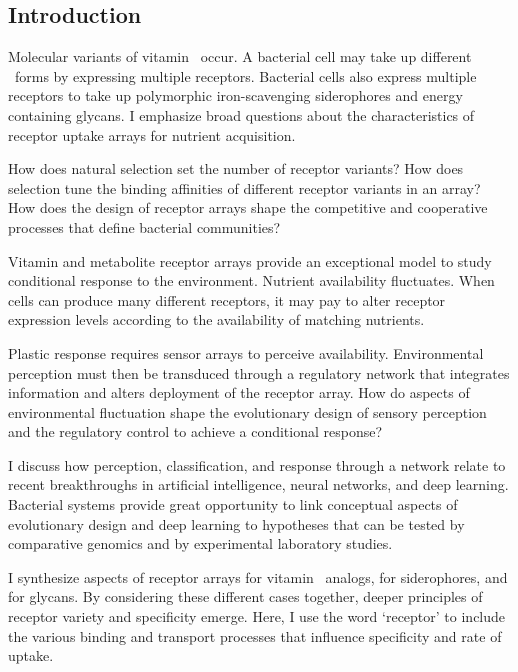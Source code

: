 \documentclass[\mydocfontsize]{article}
\begin{document}
\mymaketitle

\ifmulticol\begin{multicols}{2}\fi

\iftoc\mytoc{-24pt}{\newpage}\fi


\section{Introduction}

Molecular variants of vitamin \bt\ occur. A bacterial cell may take up different \bt\ forms by expressing multiple receptors. Bacterial cells also express multiple receptors to take up polymorphic iron-scavenging siderophores and energy containing glycans. I emphasize broad questions about the characteristics of receptor uptake arrays for nutrient acquisition. 

How does natural selection set the number of receptor variants? How does selection tune the binding affinities of different receptor variants in an array? How does the design of receptor arrays shape the competitive and cooperative processes that define bacterial communities?

Vitamin and metabolite receptor arrays provide an exceptional model to study conditional response to the environment. Nutrient availability fluctuates. When cells can produce many different receptors, it may pay to alter receptor expression levels according to the availability of matching nutrients. 

Plastic response requires sensor arrays to perceive availability. Environmental perception must then be transduced through a regulatory network that integrates information and alters deployment of the receptor array. How do aspects of environmental fluctuation shape the evolutionary design of sensory perception and the regulatory control to achieve a conditional response? 

I discuss how perception, classification, and response through a network relate to recent breakthroughs in artificial intelligence, neural networks, and deep learning. Bacterial systems provide great opportunity to link conceptual aspects of evolutionary design and deep learning to hypotheses that can be tested by comparative genomics and by experimental laboratory studies.

I synthesize aspects of receptor arrays for vitamin \bt\ analogs, for siderophores, and for glycans. By considering these different cases together, deeper principles of receptor variety and specificity emerge. Here, I use the word `receptor' to include the various binding and transport processes that influence specificity and rate of uptake.


\end{multicols}
\end{document}
